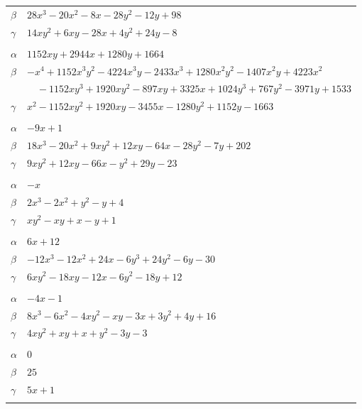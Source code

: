 \documentclass[11pt]{article}
\begin{document}
\begin{longtable}{@{}ll@{}}
$\beta$ & $28x^{3}-20x^{2}-8x-28y^{2}-12y+98$\\
$\gamma$ & $14xy^{2}+6xy-28x+4y^{2}+24y-8$\\
\addlinespace[3pt]
\multicolumn{2}{@{}l}{$\{i,j\}=\{1,53\}$, $k_{ij}=2^{9}\cdot 3$}\\
$\alpha$ & $1152xy+2944x+1280y+1664$\\
$\beta$ & $-x^{4}+1152x^{3}y^{2}-4224x^{3}y-2433x^{3}+1280x^{2}y^{2}-1407x^{2}y+4223x^{2}$\\
 & $\quad -1152xy^{3}+1920xy^{2}-897xy+3325x+1024y^{3}+767y^{2}-3971y+1533$\\
$\gamma$ & $x^{2}-1152xy^{2}+1920xy-3455x-1280y^{2}+1152y-1663$\\
\addlinespace[3pt]
\multicolumn{2}{@{}l}{$\{i,j\}=\{1,56\}$, $k_{ij}=2\cdot 7\cdot 13$}\\
$\alpha$ & $-9x+1$\\
$\beta$ & $18x^{3}-20x^{2}+9xy^{2}+12xy-64x-28y^{2}-7y+202$\\
$\gamma$ & $9xy^{2}+12xy-66x-y^{2}+29y-23$\\
\addlinespace[3pt]
\multicolumn{2}{@{}l}{$\{i,j\}=\{1,58\}$, $k_{ij}=2^{2}$}\\
$\alpha$ & $-x$\\
$\beta$ & $2x^{3}-2x^{2}+y^{2}-y+4$\\
$\gamma$ & $xy^{2}-xy+x-y+1$\\
\addlinespace[3pt]
\multicolumn{2}{@{}l}{$\{i,j\}=\{1,60\}$, $k_{ij}=2\cdot 3^{2}$}\\
$\alpha$ & $6x+12$\\
$\beta$ & $-12x^{3}-12x^{2}+24x-6y^{3}+24y^{2}-6y-30$\\
$\gamma$ & $6xy^{2}-18xy-12x-6y^{2}-18y+12$\\
\addlinespace[3pt]
\multicolumn{2}{@{}l}{$\{i,j\}=\{1,61\}$, $k_{ij}=13$}\\
$\alpha$ & $-4x-1$\\
$\beta$ & $8x^{3}-6x^{2}-4xy^{2}-xy-3x+3y^{2}+4y+16$\\
$\gamma$ & $4xy^{2}+xy+x+y^{2}-3y-3$\\
\addlinespace[3pt]
\multicolumn{2}{@{}l}{$\{i,j\}=\{1,186\}$, $k_{ij}=3\cdot 7$}\\
$\alpha$ & $0$\\
$\beta$ & $25$\\
$\gamma$ & $5x+1$\\
\addlinespace[3pt]
\multicolumn{2}{@{}l}{$\{i,j\}=\{2,7\}$, $k_{ij}=2^{5}\cdot 3^{2}\cdot 7\cdot 13$}\\

\end{longtable}
\end{document}
